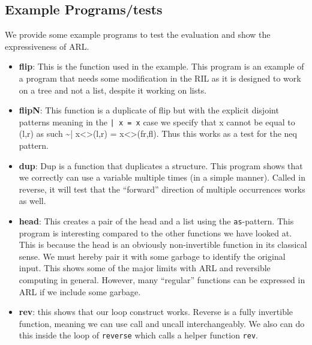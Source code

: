 \documentclass[a4paper]{article}
\begin{document}
\subsection{Example Programs/tests}
\label{sec:org50a9668}
We provide some example programs to test the evaluation and show the expressiveness of ARL.

\begin{itemize}
\item \textbf{flip}: This is the function used in the example. This program is an example of a program that needs some modification in the RIL as it is designed to work on a tree and not a list, despite it working on lists.
\item \textbf{flipN}: This function is a duplicate of flip but with the explicit disjoint patterns meaning in the \texttt{| x = x} case we specify that x cannot be equal to (l,r) as such \textasciitilde{}| x<>(l,r) = x<>(fr,fl). Thus this works as a test for the neq pattern.
\item \textbf{dup}: Dup is a function that duplicates a structure. This program shows that we correctly can use a variable multiple times (in a simple manner). Called in reverse, it will test that the ``forward'' direction of multiple occurrences works as well.
\item \textbf{head}: This creates a pair of the head and a list using the \texttt{as}-pattern. This program is interesting compared to the other functions we have looked at. This is because the head is an obviously non-invertible function in its classical sense. We must hereby pair it with some garbage to identify the original input. This shows some of the major limits with ARL and reversible computing in general. However, many ``regular'' functions can be expressed in ARL if we include some garbage.
\item \textbf{rev}: this shows that our loop construct works. Reverse is a fully invertible function, meaning we can use call and uncall interchangeably. We also can do this inside the loop of \texttt{reverse} which calls a helper function \texttt{rev}.
\end{itemize}
\end{document}
